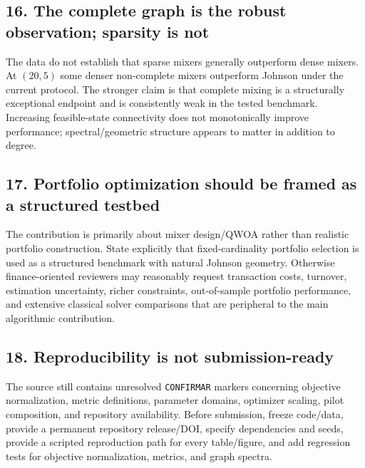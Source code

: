 \documentclass[11pt]{article}
\begin{document}
\subsection*{16. The complete graph is the robust observation; sparsity is not}
The data do not establish that sparse mixers generally outperform dense mixers. At $(20,5)$ some denser non-complete mixers outperform Johnson under the current protocol. The stronger claim is that complete mixing is a structurally exceptional endpoint and is consistently weak in the tested benchmark. Increasing feasible-state connectivity does not monotonically improve performance; spectral/geometric structure appears to matter in addition to degree.

\subsection*{17. Portfolio optimization should be framed as a structured testbed}
The contribution is primarily about mixer design/QWOA rather than realistic portfolio construction. State explicitly that fixed-cardinality portfolio selection is used as a structured benchmark with natural Johnson geometry. Otherwise finance-oriented reviewers may reasonably request transaction costs, turnover, estimation uncertainty, richer constraints, out-of-sample portfolio performance, and extensive classical solver comparisons that are peripheral to the main algorithmic contribution.

\subsection*{18. Reproducibility is not submission-ready}
The source still contains unresolved \texttt{CONFIRMAR} markers concerning objective normalization, metric definitions, parameter domains, optimizer scaling, pilot composition, and repository availability. Before submission, freeze code/data, provide a permanent repository release/DOI, specify dependencies and seeds, provide a scripted reproduction path for every table/figure, and add regression tests for objective normalization, metrics, and graph spectra.
\end{document}

